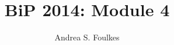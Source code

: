 

\title{BiP 2014: Module 4}
\newcommand{\ModuleShortname}{shortName}
\author{Andrea S. Foulkes}
\newcommand{\LicenseText}{Made available under the Creative Commons Attribution-ShareAlike 3.0 Unported License: http://creativecommons.org/licenses/by-sa/3.0/deed.en\textunderscore US }
\newcommand{\Instructor}{}
\newcommand{\Course}{}

\usepackage{multicol}





\begin{frame}[plain]
	\titlepage


\end{frame}







